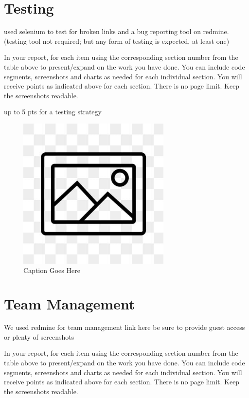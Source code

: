 \documentclass[12pt, letterpaper]{article}
\begin{document}
 \newpage

\section{Testing}
used selenium to test for broken links and a bug reporting tool on redmine. (testing tool not required; but any form of testing is expected, at least one)

In your report, for each item using the corresponding section number from the table above to present/expand on the work you have done. You can include code segments, screenshots and charts as needed for each individual section. You will receive points as indicated above for each section. There is no page limit. Keep the screenshots readable.

up to 5 pts for a testing strategy

\begin{figure}[htbp]
	\centering
	\includegraphics[width=3in]{images/placeholder.jpg}
	\caption{Caption Goes Here}
 \end{figure}

 \newpage

\section{Team Management}
We used redmine for team management link here be sure to provide guest access or plenty of screenshots

In your report, for each item using the corresponding section number from the table above to present/expand on the work you have done. You can include code segments, screenshots and charts as needed for each individual section. You will receive points as indicated above for each section. There is no page limit. Keep the screenshots readable.
\end{document}
